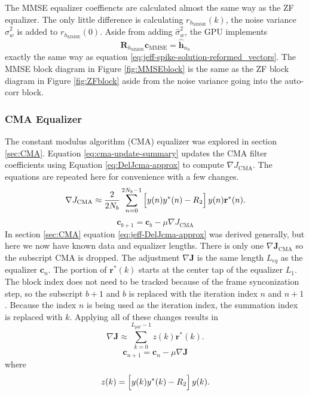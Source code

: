The MMSE equalizer coeffiencts are calculated almost the same way as the ZF equalizer.
The only little difference is calculating $r_{h_\text{MMSE}}(k)$, the noise variance $\hat{\sigma}_w^2$ is added to $r_{h_\text{MMSE}}(0)$. 
Aside from adding $\hat{\sigma}_w^2$, the GPU implements 
\begin{equation}
	\mathbf{R}_{h_\text{MMSE}} \mathbf{c}_\text{MMSE} = \hat{\mathbf{h}}_{n_0}
	\label{eq:jeff-ZF-vectors}
\end{equation}
exactly the same way as equation \eqref{eq:jeff-spike-solution-reformed_vectors}. 
The MMSE block diagram in Figure \ref{fig:MMSEblock} is the same as the ZF block diagram in Figure \ref{fig:ZFblock} aside from the noise variance going into the auto-corr block.

\subsubsection{CMA Equalizer}
The constant modulus algorithm (CMA) equalizer was explored in section \ref{sec:CMA}.
Equation \eqref{eq:cma-update-summary} updates the CMA filter coefficients using Equation \ref{eq:DelJcma-approx} to compute $\nabla J_\text{CMA}$.
The equations are repeated here for convenience with a few changes.
\begin{equation}
	\nabla J_\text{CMA} \approx \frac{2}{2N_b} \sum_{n=0}^{2N_b-1}
	\left[ \vphantom{\displaystyle\sum}  y(n) y^\ast(n) - R_2 \right]
	y(n)  \mathbf{r}^\ast(n).
\label{eq:jeff-DelJcma-approx}
\end{equation}
\begin{equation}
	\mathbf{c}_{b+1} = \mathbf{c}_b - \mu \nabla J_\text{CMA}
\label{eq:jeff-cma-update-summary}
\end{equation}
In section \ref{sec:CMA} equation \eqref{eq:jeff-DelJcma-approx} was derived generally, but here we now have known data and equalizer lengths.
There is only one $\nabla \mathbf{J}_\text{CMA}$ so the subscript CMA is dropped.
The adjustment $\nabla \mathbf{J}$ is the same length $L_{eq}$ as the equalizer $\mathbf{c}_n$.
The portion of $\mathbf{r}^\ast(k)$ starts at the center tap of the equalizer $L_1$.
The block index does not need to be tracked because of the frame synconization step, so the subscript $b+1$ and $b$ is replaced with the iteration index $n$ and $n+1$.
Because the index $n$ is being used as the iteration index, the summation index is replaced with $k$.
Applying all of these changes results in 
\begin{equation}
	\nabla \mathbf{J} \approx \sum_{k=0}^{L_{pkt}-1} 
	z(k) \mathbf{r}^\ast(k).
\label{eq:jeff-DelJcma-approx}
\end{equation}
\begin{equation}
	\mathbf{c}_{n+1} = \mathbf{c}_n - \mu \nabla \mathbf{J}
\label{eq:jeff-cma-update-summary}
\end{equation}
where
\begin{equation}
z(k) = \left[ \vphantom{\displaystyle\sum}  y(k) y^\ast(k) - R_2 \right]
	y(k).
\end{equation}

